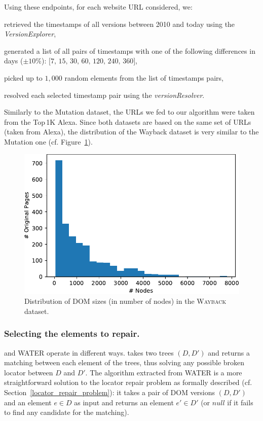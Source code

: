 Using these endpoints, for each website URL considered, we:
\begin{compactenum}
\item retrieved the timestamps of all versions between 2010 and today using the \textit{VersionExplorer},
\item generated a list of all pairs of timestamps with one of the following differences in days ($\pm 10\%$): $\text{[7, 15, 30, 60, 120, 240, 360]}$,
\item picked up to $1,000$ random elements from the list of timestamps pairs,
\item resolved each selected timestamp pair using the \textit{versionResolver}.
\end{compactenum}

Similarly to the {\sc Mutation} dataset, the URLs we fed to our algorithm were taken from the Top\,1K Alexa.
Since both datasets are based on the same set of URLs (taken from Alexa), the distribution of the {\sc Wayback} dataset is very similar to the {\sc Mutation} one (cf. Figure~\ref{fig:distribution_wayback}).

\begin{figure}[h]
  \centering
  \includegraphics[width=.8\linewidth]{erratum/distribution_wayback}
  \caption{Distribution of DOM sizes (in number of nodes) in the \textsc{Wayback} dataset.}
  \label{fig:distribution_wayback}
\end{figure}

\subsubsection{Selecting the elements to repair.}
\erratum{} and WATER operate in different ways.
\erratum{} takes two trees $(D, D')$ and returns a matching between each element of the trees, thus solving any possible broken locator between $D$ and $D'$.
The algorithm extracted from WATER is a more straightforward solution to the locator repair problem as formally described (cf. Section~\ref{locator_repair_problem}): it takes a pair of DOM versions $(D,D')$ and an element $e \in D$ as input and returns an element $e' \in D'$ (or $null$ if it fails to find any candidate for the matching).

